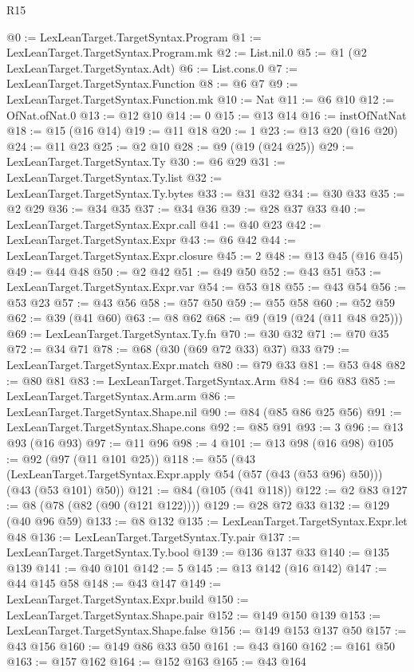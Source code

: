 \begin{lexlean}{R15}
\begin{coremodule}
@0 := LexLeanTarget.TargetSyntax.Program
@1 := LexLeanTarget.TargetSyntax.Program.mk
@2 := List.nil.{0}
@5 := @1 (@2 LexLeanTarget.TargetSyntax.Adt)
@6 := List.cons.{0}
@7 := LexLeanTarget.TargetSyntax.Function
@8 := @6 @7
@9 := LexLeanTarget.TargetSyntax.Function.mk
@10 := Nat
@11 := @6 @10
@12 := OfNat.ofNat.{0}
@13 := @12 @10
@14 := 0
@15 := @13 @14
@16 := instOfNatNat
@18 := @15 (@16 @14)
@19 := @11 @18
@20 := 1
@23 := @13 @20 (@16 @20)
@24 := @11 @23
@25 := @2 @10
@28 := @9 (@19 (@24 @25))
@29 := LexLeanTarget.TargetSyntax.Ty
@30 := @6 @29
@31 := LexLeanTarget.TargetSyntax.Ty.list
@32 := LexLeanTarget.TargetSyntax.Ty.bytes
@33 := @31 @32
@34 := @30 @33
@35 := @2 @29
@36 := @34 @35
@37 := @34 @36
@39 := @28 @37 @33
@40 := LexLeanTarget.TargetSyntax.Expr.call
@41 := @40 @23
@42 := LexLeanTarget.TargetSyntax.Expr
@43 := @6 @42
@44 := LexLeanTarget.TargetSyntax.Expr.closure
@45 := 2
@48 := @13 @45 (@16 @45)
@49 := @44 @48
@50 := @2 @42
@51 := @49 @50
@52 := @43 @51
@53 := LexLeanTarget.TargetSyntax.Expr.var
@54 := @53 @18
@55 := @43 @54
@56 := @53 @23
@57 := @43 @56
@58 := @57 @50
@59 := @55 @58
@60 := @52 @59
@62 := @39 (@41 @60)
@63 := @8 @62
@68 := @9 (@19 (@24 (@11 @48 @25)))
@69 := LexLeanTarget.TargetSyntax.Ty.fn
@70 := @30 @32
@71 := @70 @35
@72 := @34 @71
@78 := @68 (@30 (@69 @72 @33) @37) @33
@79 := LexLeanTarget.TargetSyntax.Expr.match
@80 := @79 @33
@81 := @53 @48
@82 := @80 @81
@83 := LexLeanTarget.TargetSyntax.Arm
@84 := @6 @83
@85 := LexLeanTarget.TargetSyntax.Arm.arm
@86 := LexLeanTarget.TargetSyntax.Shape.nil
@90 := @84 (@85 @86 @25 @56)
@91 := LexLeanTarget.TargetSyntax.Shape.cons
@92 := @85 @91
@93 := 3
@96 := @13 @93 (@16 @93)
@97 := @11 @96
@98 := 4
@101 := @13 @98 (@16 @98)
@105 := @92 (@97 (@11 @101 @25))
@118 := @55
    (@43 (LexLeanTarget.TargetSyntax.Expr.apply @54 (@57 (@43 (@53 @96) @50))) (@43 (@53 @101) @50))
@121 := @84 (@105 (@41 @118))
@122 := @2 @83
@127 := @8 (@78 (@82 (@90 (@121 @122))))
@129 := @28 @72 @33
@132 := @129 (@40 @96 @59)
@133 := @8 @132
@135 := LexLeanTarget.TargetSyntax.Expr.let @48
@136 := LexLeanTarget.TargetSyntax.Ty.pair
@137 := LexLeanTarget.TargetSyntax.Ty.bool
@139 := @136 @137 @33
@140 := @135 @139
@141 := @40 @101
@142 := 5
@145 := @13 @142 (@16 @142)
@147 := @44 @145 @58
@148 := @43 @147
@149 := LexLeanTarget.TargetSyntax.Expr.build
@150 := LexLeanTarget.TargetSyntax.Shape.pair
@152 := @149 @150 @139
@153 := LexLeanTarget.TargetSyntax.Shape.false
@156 := @149 @153 @137 @50
@157 := @43 @156
@160 := @149 @86 @33 @50
@161 := @43 @160
@162 := @161 @50
@163 := @157 @162
@164 := @152 @163
@165 := @43 @164

\end{coremodule}
\end{lexlean}
